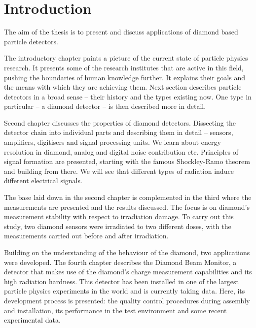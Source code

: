 
\chapter{Introduction}
\label{ch:intro}


The aim of the thesis is to present and discuss applications of diamond based particle detectors. 

The introductory chapter paints a picture of the current state of particle physics research. It presents some of the research institutes that are active in this field, pushing the boundaries of human knowledge further. It explains their goals and the means with which they are achieving them. Next section describes particle detectors in a broad sense -- their history and the types existing now. One type in particular -- a diamond detector -- is then described more in detail.

Second chapter discusses the properties of diamond detectors. Dissecting the detector chain into individual parts and describing them in detail -- sensors, amplifiers, digitisers and signal processing units. We learn about energy resolution in diamond, analog and digital noise contribution etc. Principles of signal formation are presented, starting with the famous Shockley-Ramo theorem and building from there. We will see that different types of radiation induce different electrical signals.

The base laid down in the second chapter is complemented in the third where the measurements are presented and the results discussed. The focus is on diamond's measurement stability with respect to irradiation damage. To carry out this study, two diamond sensors were irradiated to two different doses, with the measurements carried out before and after irradiation.

Building on the understanding of the behaviour of the diamond, two applications were developed. The fourth chapter describes the Diamond Beam Monitor, a detector that makes use of the diamond's charge measurement capabilities and its high radiation hardness. This detector has been installed in one of the largest particle physics experiments in the world and is currently taking data. Here, its development process is presented: the quality control procedures during assembly and installation, its performance in the test environment and some recent experimental data.

